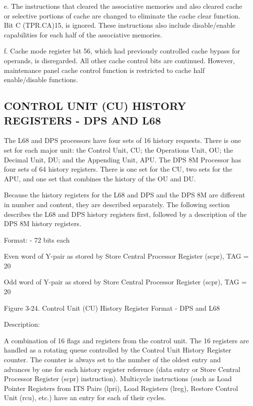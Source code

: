 e. The instructions that cleared the associative memories and also cleared
cache or selective portions of cache are changed to eliminate the cache clear
function. Bit C (TPR.CA)15, is ignored. These instructions also include
disable/enable capabilities for each half of the associative memories.

f. Cache mode register bit 56, which had previously controlled cache bypass for
operands, is disregarded. All other cache control bits are continued. However,
maintenance panel cache control function is restricted to cache half
enable/disable functions.

\subsection{CONTROL UNIT (CU) HISTORY REGISTERS - DPS AND L68}

The L68 and DPS processors have four sets of 16 history requests. There is one
set for each major unit: the Control Unit, CU; the Operations Unit, OU; the
Decimal Unit, DU; and the Appending Unit, APU. The DPS 8M Processor has four
sets of 64 history registers. There is one set for the CU, two sets for the
APU, and one set that combines the history of the OU and DU.

Because the history registers for the L68 and DPS and the DPS 8M are different
in number and content, they are described separately. The following section
describes the L68 and DPS history registers first, followed by a description of
the DPS 8M history registers.

Format: - 72 bits each

Even word of Y-pair as stored by Store Central Processor Register (scpr), TAG = 20

Odd word of Y-pair as stored by Store Central Processor Register (scpr), TAG = 20

Figure 3-24. Control Unit (CU) History Register Format - DPS and L68

Description:

A combination of 16 flags and registers from the control unit. The 16 registers
are handled as a rotating queue controlled by the Control Unit History Register
counter. The counter is always set to the number of the oldest entry and
advances by one for each history register reference (data entry or Store
Central Processor Register (scpr) instruction). Multicycle instructions (such
as Load Pointer Registers from ITS Pairs (lpri), Load Registers (lreg), Restore
Control Unit (rcu), etc.) have an entry for each of their cycles.

